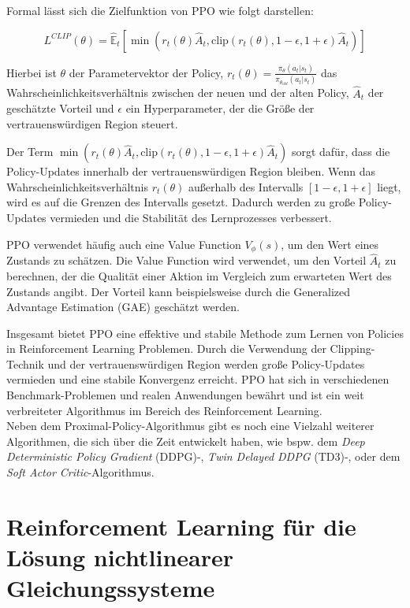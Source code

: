 \documentclass{article}
\theoremstyle{newline}
\begin{document}
\begin{onehalfspace}
Formal lässt sich die Zielfunktion von PPO wie folgt darstellen:

\begin{equation}
	L^{CLIP}(\theta) = \hat{\mathbb{E}}_t \left[ \min(r_t(\theta)\hat{A}_t, \text{clip}(r_t(\theta), 1-\epsilon, 1+\epsilon)\hat{A}_t) \right]
\end{equation}

Hierbei ist $\theta$ der Parametervektor der Policy, $r_t(\theta) = \frac{\pi_\theta(a_t|s_t)}{\pi_{\theta_{old}}(a_t|s_t)}$ das Wahrscheinlichkeitsverhältnis zwischen der neuen und der alten Policy, $\hat{A}_t$ der geschätzte Vorteil und $\epsilon$ ein Hyperparameter, der die Größe der vertrauenswürdigen Region steuert.
\medskip

Der Term $\min(r_t(\theta)\hat{A}_t, \text{clip}(r_t(\theta), 1-\epsilon, 1+\epsilon)\hat{A}_t)$ sorgt dafür, dass die Policy-Updates innerhalb der vertrauenswürdigen Region bleiben. Wenn das Wahrscheinlichkeitsverhältnis $r_t(\theta)$ außerhalb des Intervalls $[1-\epsilon, 1+\epsilon]$ liegt, wird es auf die Grenzen des Intervalls gesetzt. Dadurch werden zu große Policy-Updates vermieden und die Stabilität des Lernprozesses verbessert.
\medskip

PPO verwendet häufig auch eine Value Function $V_\phi(s)$, um den Wert eines Zustands zu schätzen. Die Value Function wird verwendet, um den Vorteil $\hat{A}_t$ zu berechnen, der die Qualität einer Aktion im Vergleich zum erwarteten Wert des Zustands angibt. Der Vorteil kann beispielsweise durch die Generalized Advantage Estimation (GAE) \cite{schulman2015high} geschätzt werden.
\medskip

Insgesamt bietet PPO eine effektive und stabile Methode zum Lernen von Policies in Reinforcement Learning Problemen. Durch die Verwendung der Clipping-Technik und der vertrauenswürdigen Region werden große Policy-Updates vermieden und eine stabile Konvergenz erreicht. PPO hat sich in verschiedenen Benchmark-Problemen und realen Anwendungen bewährt und ist ein weit verbreiteter Algorithmus im Bereich des Reinforcement Learning.
\\

Neben dem Proximal-Policy-Algorithmus gibt es noch eine Vielzahl weiterer Algorithmen, die sich über die Zeit entwickelt haben, wie bspw. dem \textit{Deep Deterministic Policy Gradient} (DDPG)-, \textit{Twin Delayed DDPG} (TD3)-, oder dem \textit{Soft Actor Critic}-Algorithmus.


\section{Reinforcement Learning für die Lösung nichtlinearer Gleichungssysteme}


\end{onehalfspace}
\end{document}
